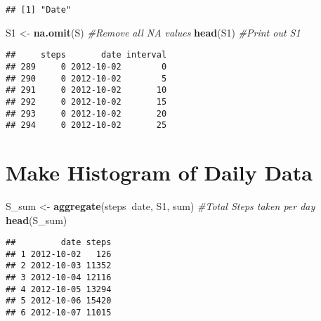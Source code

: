 \documentclass[]{article}
\newenvironment{Shaded}{\begin{snugshade}}{\end{snugshade}}
\newcommand{\KeywordTok}[1]{\textcolor[rgb]{0.13,0.29,0.53}{\textbf{#1}}}
\newcommand{\StringTok}[1]{\textcolor[rgb]{0.31,0.60,0.02}{#1}}
\newcommand{\CommentTok}[1]{\textcolor[rgb]{0.56,0.35,0.01}{\textit{#1}}}
\newcommand{\OperatorTok}[1]{\textcolor[rgb]{0.81,0.36,0.00}{\textbf{#1}}}
\newcommand{\NormalTok}[1]{#1}
\begin{document}
\begin{Shaded}
\end{Shaded}

\begin{verbatim}
## [1] "Date"
\end{verbatim}

\begin{Shaded}
\begin{Highlighting}[]
\NormalTok{S1 <-}\StringTok{ }\KeywordTok{na.omit}\NormalTok{(S) }\CommentTok{#Remove all NA values}
\KeywordTok{head}\NormalTok{(S1) }\CommentTok{#Print out S1}
\end{Highlighting}
\end{Shaded}

\begin{verbatim}
##     steps       date interval
## 289     0 2012-10-02        0
## 290     0 2012-10-02        5
## 291     0 2012-10-02       10
## 292     0 2012-10-02       15
## 293     0 2012-10-02       20
## 294     0 2012-10-02       25
\end{verbatim}

\section{Make Histogram of Daily
Data}\label{make-histogram-of-daily-data}

\begin{Shaded}
\begin{Highlighting}[]
\NormalTok{S_sum <-}\StringTok{ }\KeywordTok{aggregate}\NormalTok{(steps}\OperatorTok{~}\NormalTok{date, S1, sum) }\CommentTok{#Total Steps taken per day}
\KeywordTok{head}\NormalTok{(S_sum)}
\end{Highlighting}
\end{Shaded}

\begin{verbatim}
##         date steps
## 1 2012-10-02   126
## 2 2012-10-03 11352
## 3 2012-10-04 12116
## 4 2012-10-05 13294
## 5 2012-10-06 15420
## 6 2012-10-07 11015
\end{verbatim}
\end{document}
